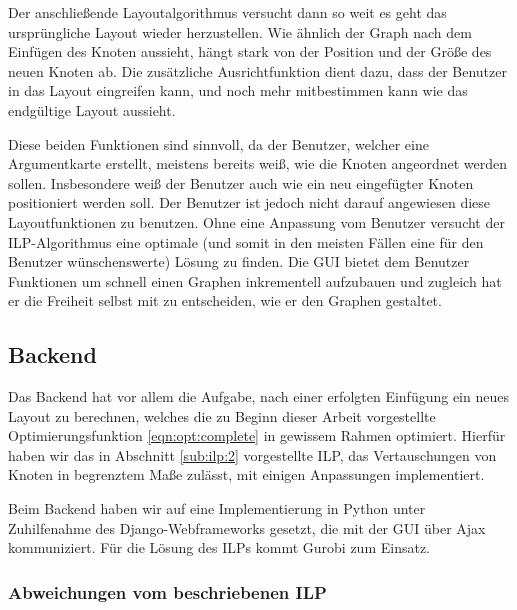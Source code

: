 Der anschließende Layoutalgorithmus versucht dann so weit es geht das ursprüngliche
Layout wieder herzustellen. Wie ähnlich der Graph nach dem Einfügen des Knoten aussieht,
hängt stark von der Position und der Größe des neuen Knoten ab. Die zusätzliche
Ausrichtfunktion dient dazu, dass der Benutzer in das Layout eingreifen kann, und noch mehr
mitbestimmen kann wie das endgültige Layout aussieht.

Diese beiden Funktionen sind sinnvoll, da der Benutzer, welcher eine Argumentkarte erstellt,
meistens bereits weiß, wie die Knoten angeordnet werden sollen. Insbesondere weiß der
Benutzer auch wie ein neu eingefügter Knoten positioniert werden soll. Der Benutzer ist
jedoch nicht darauf angewiesen diese Layoutfunktionen zu benutzen. Ohne eine Anpassung
vom Benutzer versucht der ILP-Algorithmus eine optimale (und somit in den meisten Fällen
eine für den Benutzer wünschenswerte) Lösung zu finden.
 Die GUI bietet dem Benutzer Funktionen um schnell einen Graphen inkrementell aufzubauen
und zugleich hat er die Freiheit selbst mit zu entscheiden, wie er den Graphen gestaltet.



\subsection{Backend}

Das Backend hat vor allem die Aufgabe, nach einer erfolgten Einfügung ein neues Layout zu berechnen, welches die zu Beginn dieser Arbeit vorgestellte Optimierungsfunktion \ref{eqn:opt:complete} in gewissem Rahmen optimiert. Hierfür haben wir das in Abschnitt \ref{sub:ilp:2} vorgestellte ILP, das Vertauschungen von Knoten in begrenztem Maße zulässt, mit einigen Anpassungen implementiert.

Beim Backend haben wir auf eine Implementierung in Python unter Zuhilfenahme des Django-Webframeworks\cite{django} gesetzt, die mit der GUI über Ajax kommuniziert. Für die Lösung des ILPs kommt Gurobi\cite{gurobi} zum Einsatz.

\subsubsection{Abweichungen vom beschriebenen ILP}
\label{sub:impl:opt}

